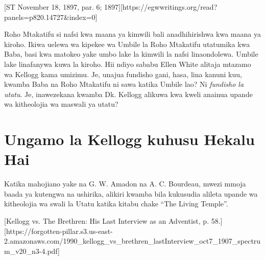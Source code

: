 [ST November 18, 1897, par. 6; 1897][https://egwwritings.org/read?panels=p820.14727&index=0]


Roho Mtakatifu si nafsi kwa maana ya kimwili bali anadhihirishwa kwa maana ya kiroho. Ikiwa uelewa wa kipekee wa Umbile la Roho Mtakatifu utatumika kwa Baba, basi kwa matokeo yake umbo lake la kimwili la nafsi linaondolewa. Umbile lake linafanywa kuwa la kiroho. Hii ndiyo sababu Ellen White alitaja mtazamo wa Kellogg kama umizimu. Je, unajua fundisho gani, hasa, lina kanuni kuu, kwamba Baba na Roho Mtakatifu ni sawa katika Umbile lao? Ni \textit{fundisho la utatu}. Je, inawezekana kwamba Dk. Kellogg alikuwa kwa kweli anainua upande wa kitheolojia wa maswali ya utatu?


\section*{Ungamo la Kellogg kuhusu Hekalu Hai}


Katika mahojiano yake na G. W. Amadon na A. C. Bourdeau, mwezi mmoja baada ya kutengwa na ushirika, alikiri kwamba bila kukusudia alileta upande wa kitheolojia wa swali la Utatu katika kitabu chake “The Living Temple”.


[Kellogg vs. The Brethren: His Last Interview as an Adventist, p. 58.][https://forgotten-pillar.s3.us-east-2.amazonaws.com/1990\_kellogg\_vs\_brethren\_lastInterview\_oct7\_1907\_spectrum\_v20\_n3-4.pdf]


